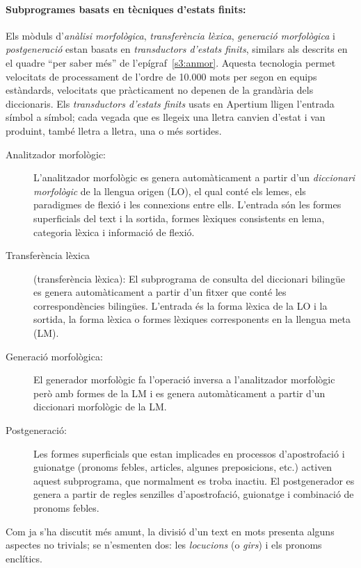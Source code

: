 \paragraph{Subprogrames basats en tècniques d'estats finits:}
Els mòduls d'\emph{anàlisi morfològica}, \emph{transferència
  lèxica}, \emph{generació morfològica} i {\em postgeneració} estan
basats en \emph{transductors d'estats finits}, similars als descrits
en el quadre ``per saber més'' de l'epígraf~\ref{s3:anmor}. Aquesta
tecnologia permet velocitats de processament de l'ordre de 10.000 mots
per segon en equips estàndards, velocitats que pràcticament no depenen
de la grandària dels diccionaris. Els \emph{transductors d'estats
  finits} usats en Apertium lligen l'entrada símbol a
símbol; cada vegada que es llegeix una lletra canvien d'estat i van
produint, també lletra a lletra, una o més sortides.
\begin{description}
\item[Analitzador morfològic:] L'analitzador morfològic es genera
  automàticament a partir d'un \emph{diccionari morfològic} de la
  llengua origen (LO), el qual conté els lemes, els paradigmes de
  flexió i les connexions entre ells. L'entrada són les formes
  superficials del text i la sortida, formes lèxiques consistents en
  lema, categoria lèxica i informació de flexió.
 \item[Transferència lèxica] (transferència lèxica): El subprograma de
   consulta del diccionari bilingüe es genera automàticament a partir
   d'un fitxer que conté les correspondències bilingües. L'entrada és
   la forma lèxica de la LO i la sortida, la forma lèxica o formes
   lèxiques corresponents en la llengua meta (LM).
 \item[Generació morfològica:] El generador morfològic fa l'operació
   inversa a l'analitzador morfològic però amb formes de la LM i es
   genera automàticament a partir d'un diccionari morfològic de la LM.
 \item[Postgeneració:] Les formes superficials que estan implicades en
   processos d'apostrofació i guionatge (pronoms febles, articles,
   algunes preposicions, etc.) activen aquest subprograma, que
   normalment es troba inactiu. El postgenerador es genera a partir de
   regles senzilles d'apostrofació, guionatge i combinació de pronoms
   febles.
 \end{description}
 Com ja s'ha discutit més amunt, la divisió d'un
 text en mots presenta alguns aspectes no trivials; se n'esmenten dos:
 les \emph{locucions} (o \emph{girs}) i els pronoms enclítics.

